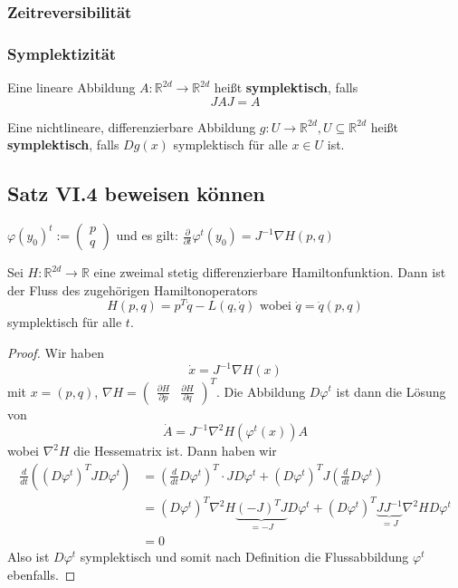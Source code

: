 \documentclass[]{article}
\begin{document}
\subsubsection*{Zeitreversibilität}


\subsubsection*{Symplektizität}

Eine lineare Abbildung $A : \mathbb{R}^{2d} \to \mathbb{R}^{2d}$ heißt \textbf{symplektisch}, falls
\begin{equation*}
J A J = A
\end{equation*}

Eine nichtlineare, differenzierbare Abbildung $g : U \to \mathbb{R}^{2d}, U \subseteq \mathbb{R}^{2d}$ heißt \textbf{symplektisch}, falls $D g(x)$ symplektisch für alle $x \in U$ ist.



\subsection*{Satz VI.4 beweisen können}
$\varphi(y_0)^t:=\begin{pmatrix} p \\ q \end{pmatrix}$ und es gilt: $\frac{\partial }{\partial t} \varphi^t(y_0)= J^{-1} \nabla H(p,q)$

 Sei $H : \mathbb{R}^{2d} \to \mathbb{R}$ eine zweimal stetig differenzierbare Hamiltonfunktion. Dann ist der Fluss des zugehörigen Hamiltonoperators
 \begin{equation*}
 	H(p,q) = p^T \dot{q} - L(q, \dot{q}) \text{ wobei } \dot{q} = \dot{q}(p,q)
 \end{equation*}
symplektisch für alle $t$.
 
\begin{proof}
	Wir haben 
	\[
	\dot{x} = J^{-1} \nabla H(x)
	\]
	mit $x = (p, q)$, $\nabla H = \begin{pmatrix}\frac{\partial H}{\partial p} & \frac{\partial H}{\partial q}\end{pmatrix}^T$. Die Abbildung $D \varphi^t$ ist dann die Lösung von
	\begin{equation*}
	\dot{A} = J^{-1} \nabla^2 H (\varphi^t(x)) A
	\end{equation*}
	wobei $\nabla^2 H$ die Hessematrix ist. Dann haben wir
	\begin{align*}
	\frac{d}{dt} \left( (D \varphi^t)^T J D \varphi^t \right)
	&= \left( \frac{d}{dt} D \varphi^t \right)^T \cdot J D \varphi^t + (D \varphi^t)^T J \left( \frac{d}{dt} D \varphi^t \right) \\
	&= (D \varphi^t)^T \nabla^2 H \underbrace{(-J)^T J}_{=-J} D \varphi^t + (D \varphi^t)^T \underbrace{J J^{-1}}_{=J} \nabla^2 H D \varphi^t \\
	&= 0
	\end{align*}
	Also ist $D \varphi^t$ symplektisch und somit nach Definition die Flussabbildung $\varphi^t$ ebenfalls.
\end{proof}
\end{document}
